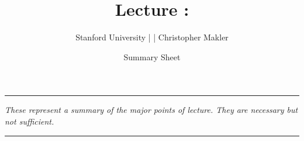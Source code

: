 \title{Lecture \lectureNumber{}: \topic{}}
\date{Summary Sheet}
\author{Stanford University | \course{} | Christopher Makler}

\maketitle
\begin{center}
\vspace{0.2in}
\hrule
\vspace{0.2in}
\textit{These represent a summary of the major points of lecture. They are necessary but not sufficient.}
\vspace{0.2in}
\hrule
\vspace{0.2in}
\end{center}